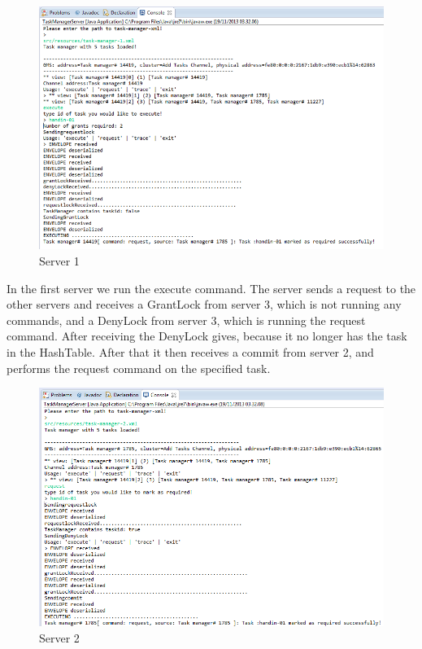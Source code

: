 \begin{figure}[H]
\caption{Server 1}
\includegraphics[scale=0.6]{images/CCServer1.png}
\end{figure}
\vspace{10pt}

In the first server we run the execute command. The server sends a request to the other servers and receives a GrantLock from server 3, which is not running any commands, and a DenyLock from server 3, which is running the request command. After receiving the DenyLock gives, because it no longer has the task in the HashTable. After that it then receives a commit from server 2, and performs the request command on the specified task. \\

\begin{figure}[H]
\caption{Server 2}
\includegraphics[scale=0.6]{images/CCServer2.png}
\end{figure}
\vspace{10pt}

